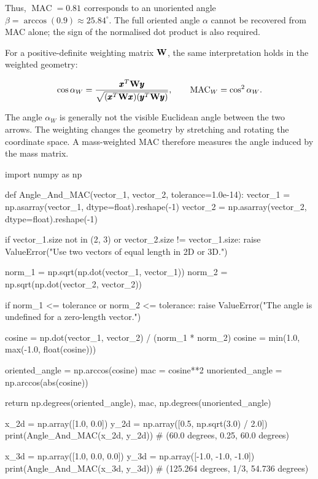 Thus, $\operatorname{MAC}=0.81$ corresponds to an unoriented angle
$\beta=\arccos(0.9)\approx25.84^\circ$. The full oriented angle $\alpha$ cannot
be recovered from MAC alone; the sign of the normalised dot product is also
required.

For a positive-definite weighting matrix $\mathbf{W}$, the same interpretation holds
in the weighted geometry:

\begin{equation}
    \cos\alpha_W
    =
    \frac{\pmb{x}^{T}\mathbf{W}\pmb{y}}
    {\sqrt{(\pmb{x}^{T}\mathbf{W}\pmb{x})(\pmb{y}^{T}\mathbf{W}\pmb{y})}},
    \qquad
    \operatorname{MAC}_W=\cos^2\alpha_W.
\end{equation}

The angle $\alpha_W$ is generally not the visible Euclidean angle between the
two arrows. The weighting changes the geometry by stretching and rotating the
coordinate space. A mass-weighted MAC therefore measures the angle induced by
the mass matrix.

\begin{python}
import numpy as np


def Angle_And_MAC(vector_1, vector_2, tolerance=1.0e-14):
    vector_1 = np.asarray(vector_1, dtype=float).reshape(-1)
    vector_2 = np.asarray(vector_2, dtype=float).reshape(-1)

    if vector_1.size not in (2, 3) or vector_2.size != vector_1.size:
        raise ValueError("Use two vectors of equal length in 2D or 3D.")

    norm_1 = np.sqrt(np.dot(vector_1, vector_1))
    norm_2 = np.sqrt(np.dot(vector_2, vector_2))

    if norm_1 <= tolerance or norm_2 <= tolerance:
        raise ValueError("The angle is undefined for a zero-length vector.")

    cosine = np.dot(vector_1, vector_2) / (norm_1 * norm_2)
    cosine = min(1.0, max(-1.0, float(cosine)))

    oriented_angle = np.arccos(cosine)
    mac = cosine**2
    unoriented_angle = np.arccos(abs(cosine))

    return np.degrees(oriented_angle), mac, np.degrees(unoriented_angle)


x_2d = np.array([1.0, 0.0])
y_2d = np.array([0.5, np.sqrt(3.0) / 2.0])
print(Angle_And_MAC(x_2d, y_2d))
# (60.0 degrees, 0.25, 60.0 degrees)

x_3d = np.array([1.0, 0.0, 0.0])
y_3d = np.array([-1.0, -1.0, -1.0])
print(Angle_And_MAC(x_3d, y_3d))
# (125.264 degrees, 1/3, 54.736 degrees)
\end{python}

